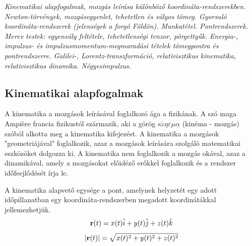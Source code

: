 \documentclass[../main.tex]{subfiles}
\begin{document}
\textit{Kinematikai alapfogalmak, mozgás leírása különböző koordináta-rendszerekben.
Newton-törvények, mozgásegyenlet, tehetetlen és súlyos tömeg. Gyorsuló koordináta-rendszerek (jelenségek a forgó Földön).
Munkatétel. Pontrendszerek. Merev testek: egyensúly feltétele, tehetetlenségi tenzor, pörgettyűk. Energia-, impulzus- és 
impulzusmomentum-megmaradási tételek tömegpontra és pontrendszerre. Galilei-, Lorentz-transzformáció, relativisztikus kinematika,
relativisztikus dinamika. Négyesimpulzus.}
\subsection{Kinematikai alapfogalmak}
A kinematika a mozgások leírásával foglalkozó ága a fizikának. A szó maga Ampière francia fizikustól származik, aki a görög $\kappa \acute{\iota} \eta \varepsilon \mu \alpha$ (kinéma - mozgás) szóból alkotta meg a kinematika kifejezést.
A kinematika a mozgások "geometriájával" foglalkozik, azaz a mozgások leírására szolgáló matematikai eszközöket dolgozza ki. A kinematika nem foglalkozik a mozgás okával, azaz a dinamikával,
amely a mozgásokat előidéző erőkkel foglalkozik és a rendszer időfeejlődését írja le.

A kinematika alapvető egysége a pont, amelynek helyzetét egy adott időpillanatban egy koordináta-rendszerben megadott koordinátákkal jellemezhetjük.
\begin{equation}
    \bold{r}(t) = x(t)\hat{i} + y(t)\hat{j} + z(t)\hat{k}
\end{equation}
\begin{equation}
    | \bold{r}(t) | = \sqrt{x(t)^2 + y(t)^2 + z(t)^2}
\end{equation}
\end{document}

